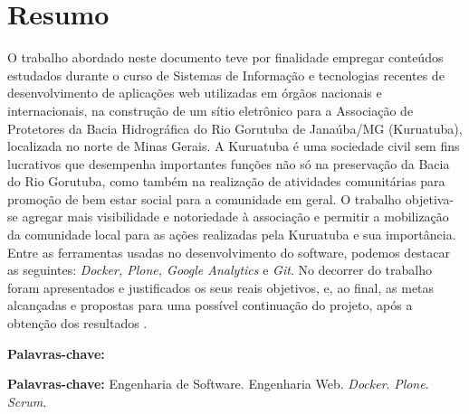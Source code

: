 \chapter*{Resumo}

\vspace{0.4cm}

\noindent O trabalho abordado neste documento teve por finalidade empregar conteúdos estudados durante o curso de Sistemas de Informação e tecnologias recentes de desenvolvimento de aplicações web utilizadas em órgãos nacionais e internacionais, na construção de um sítio eletrônico para a Associação de Protetores da Bacia Hidrográfica do Rio Gorutuba de Janaúba/MG (Kuruatuba), localizada no norte de Minas Gerais. A Kuruatuba é uma sociedade civil sem fins lucrativos que desempenha importantes funções não só na preservação da Bacia do Rio Gorutuba, como também na realização de atividades comunitárias para promoção de bem estar social para a comunidade em geral. O trabalho objetiva-se agregar mais visibilidade e notoriedade à associação e permitir a mobilização da comunidade local para as ações realizadas pela Kuruatuba e sua importância.   
Entre as ferramentas usadas no desenvolvimento do software, podemos destacar as seguintes: \textit{Docker, Plone, Google Analytics} e \textit{Git}.  
No decorrer do trabalho foram apresentados e justificados os seus reais objetivos, e, ao final, as metas alcançadas e propostas para uma possível continuação do projeto, após a obtenção dos resultados .

\begin{labeling}{\textbf{Palavras-chave:}}
\item[\textbf{Palavras-chave:}] 
Engenharia de Software.
Engenharia Web.
\textit{Docker}.
\textit{Plone}.
\textit{Scrum}.
\end{labeling}

